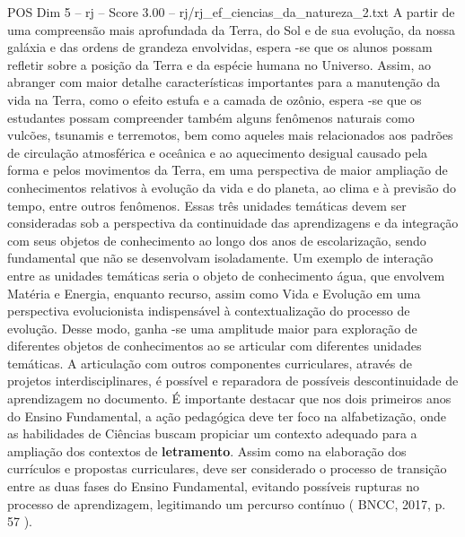 \begin{textsample}{POS Dim 5 – rj – Score 3.00 – rj/rj\_ef\_ciencias\_da\_natureza\_2.txt}
A partir de uma compreensão mais aprofundada da Terra, do Sol e de sua evolução, da nossa galáxia e das ordens de grandeza envolvidas, espera -se que os alunos possam refletir sobre a posição da Terra e da espécie humana no Universo.
Assim, ao abranger com maior detalhe características importantes para a manutenção da vida na Terra, como o efeito estufa e a camada de ozônio, espera -se que os estudantes possam compreender também alguns fenômenos naturais como vulcões, tsunamis e terremotos, bem como aqueles mais relacionados aos padrões de circulação atmosférica e oceânica e ao aquecimento desigual causado pela forma e pelos movimentos da Terra, em uma perspectiva de maior ampliação de conhecimentos relativos à evolução da vida e do planeta, ao clima e à previsão do tempo, entre outros fenômenos.
Essas três unidades temáticas devem ser consideradas sob a perspectiva da continuidade das aprendizagens e da integração com seus objetos de conhecimento ao longo dos anos de escolarização, sendo fundamental que não se desenvolvam isoladamente.
Um exemplo de interação entre as unidades temáticas seria o objeto de conhecimento água, que envolvem Matéria e Energia, enquanto recurso, assim como Vida e Evolução em uma perspectiva evolucionista indispensável à contextualização do processo de evolução.
Desse modo, ganha -se uma amplitude maior para exploração de diferentes objetos de conhecimentos ao se articular com diferentes unidades temáticas.
A articulação com outros componentes curriculares, através de projetos interdisciplinares, é possível e reparadora de possíveis descontinuidade de aprendizagem no documento.
É importante destacar que nos dois primeiros anos do Ensino Fundamental, a ação pedagógica deve ter foco na alfabetização, onde as habilidades de Ciências buscam propiciar um contexto adequado para a ampliação dos contextos de \textbf{letramento}.
Assim como na elaboração dos currículos e propostas curriculares, deve ser considerado o processo de transição entre as duas fases do Ensino Fundamental, evitando possíveis rupturas no processo de aprendizagem, legitimando um percurso contínuo ( BNCC, 2017, p. 57 ).

\end{textsample}
